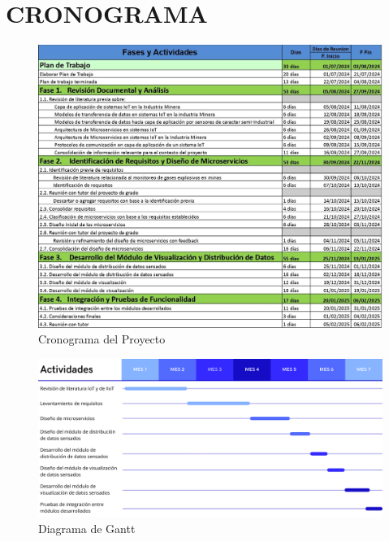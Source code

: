 \documentclass[stu,12pt,floatsintext]{apa7}
\begin{document}
	\section{CRONOGRAMA}
		\begin{figure}[H]
		\centering
		\includegraphics[scale=0.7]{cronograma.jpg}
		\captionsetup{justification=centering}
		\caption{Cronograma del Proyecto}
		\small
		\label{cronograma}
	\end{figure}
		\begin{figure}[H]
		\centering
		\includegraphics[scale=0.18]{diagrama_gantt.png}
		\captionsetup{justification=centering}
		\caption{Diagrama de Gantt}
		\small
		\label{diagrama_gantt}
	\end{figure}
\end{document}
